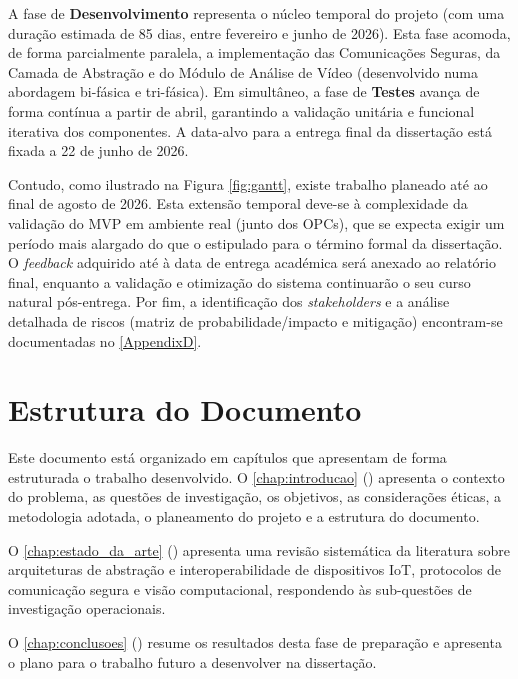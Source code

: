 A fase de \textbf{Desenvolvimento} representa o núcleo temporal do projeto (com uma duração estimada de 85 dias, entre fevereiro e junho de 2026). Esta fase acomoda, de forma parcialmente paralela, a implementação das Comunicações Seguras, da Camada de Abstração e do Módulo de Análise de Vídeo (desenvolvido numa abordagem bi-fásica e tri-fásica). Em simultâneo, a fase de \textbf{Testes} avança de forma contínua a partir de abril, garantindo a validação unitária e funcional iterativa dos componentes. A data-alvo para a entrega final da dissertação está fixada a 22 de junho de 2026.

Contudo, como ilustrado na Figura \ref{fig:gantt}, existe trabalho planeado até ao final de agosto de 2026. Esta extensão temporal deve-se à complexidade da validação do \gls{MVP} em ambiente real (junto dos \glspl{OPC}), que se expecta exigir um período mais alargado do que o estipulado para o término formal da dissertação. O \textit{feedback} adquirido até à data de entrega académica será anexado ao relatório final, enquanto a validação e otimização do sistema continuarão o seu curso natural pós-entrega. Por fim, a identificação dos \textit{stakeholders} e a análise detalhada de riscos (matriz de probabilidade/impacto e mitigação) encontram-se documentadas no \autoref{AppendixD}.

\section{Estrutura do Documento}
\label{sec:estrutura_documento}


Este documento está organizado em capítulos que apresentam de forma estruturada o trabalho desenvolvido. O \autoref{chap:introducao} () apresenta o contexto do problema, as questões de investigação, os objetivos, as considerações éticas, a metodologia adotada, o planeamento do projeto e a estrutura do documento.

O \autoref{chap:estado_da_arte} () apresenta uma revisão sistemática da literatura sobre arquiteturas de abstração e interoperabilidade de dispositivos \gls{IoT}, protocolos de comunicação segura e visão computacional, respondendo às sub-questões de investigação operacionais.

O \autoref{chap:conclusoes} () resume os resultados desta fase de preparação e apresenta o plano para o trabalho futuro a desenvolver na dissertação.

